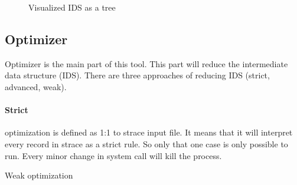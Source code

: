 \begin{figure}[H]
\centering
  \caption{Visualized IDS as a tree}
  \label{fig:tikz:IDStree}
\end{figure}

\subsection{Optimizer}
Optimizer is the main part of this tool.
This part will reduce the intermediate data structure (IDS).
There are three approaches of reducing IDS (strict, advanced, weak).

	\paragraph{Strict}
	optimization is defined as 1:1 to strace input file.
	It means that it will interpret every record in strace as a strict rule.
	So only that one case is only possible to run.
	Every minor change in system call will kill the process.

	\begin{algorithm}[H]



		\caption{Weak optimization}\label{algo:weak}
	\end{algorithm}

